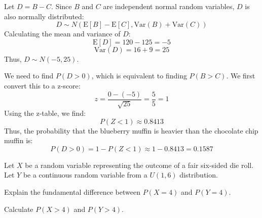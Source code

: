 \documentclass[a4paper, 10pt]{article}
\begin{document}
\begin{problem}
\end{problem}

\begin{solution}
Let \( D = B - C \). Since \( B \) and \( C \) are independent normal random variables, \( D \) is also normally distributed:
\[ D \sim N(\text{E}[B] - \text{E}[C], \text{Var}(B) + \text{Var}(C)) \]
Calculating the mean and variance of \( D \):
\[ \text{E}[D] = 120 - 125 = -5 \]
\[ \text{Var}(D) = 16 + 9 = 25 \]
Thus, \( D \sim N(-5, 25) \).

We need to find \( P(D > 0) \), which is equivalent to finding \( P(B > C) \).
We first convert this to a z-score:
\[ z = \frac{0 - (-5)}{\sqrt{25}} = \frac{5}{5} = 1 \]
Using the z-table, we find:
\[ P(Z < 1) \approx 0.8413 \]
Thus, the probability that the blueberry muffin is heavier than the chocolate chip muffin is:
\[ P(D > 0) = 1 - P(Z < 1) \approx 1 - 0.8413 = \boxed{0.1587} \]
\end{solution}

\newpage

\begin{problem}
Let \( X \) be a random variable representing the outcome of a fair six-sided die roll.
Let \( Y \) be a continuous random variable from a \( U(1, 6) \) distribution.
\begin{subproblems}
    \item Explain the fundamental difference between \( P(X = 4) \) and \( P(Y = 4) \).
    \item Calculate \( P(X > 4) \) and \( P(Y > 4) \).
\end{subproblems}
\end{problem}
\end{document}
